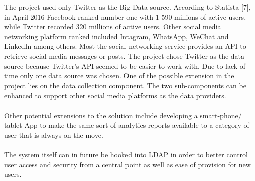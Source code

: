 \documentclass[12pt]{article} %
\begin{document}
	The project used only Twitter as the Big Data source. According to Statista [7], in April 2016 Facebook ranked number one with 1 590 millions of active users, while Twitter recorded 320 millions of active users. Other social media networking platform ranked included Intagram, WhatsApp, WeChat and LinkedIn among others. Most the social networking service provides an API to retrieve social media messages or posts. The project chose Twitter as the data source because Twitter’s API seemed to be easier to work with. Due to lack of time only one data source was chosen. One of the possible extension in the project lies on the data collection component. The two sub-components can be enhanced to support other social media platforms as the data providers.
	\\
	\\
	Other potential extensions to the solution include developing a smart-phone/ tablet App to make the same sort of analytics reports available to a category of user that is always on the move.
	\\
	\\
	The system itself can in future be hooked into LDAP in order to better control user access and security from a central point as well as ease of provision for new users.
	
	
	
	
	
	
	
	
\end{document}
